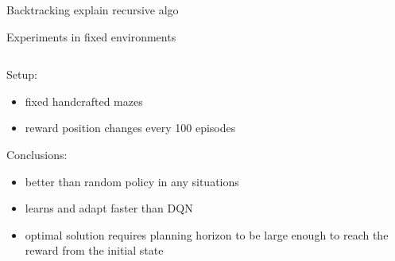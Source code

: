 \documentclass[default]{beamer}
\begin{document}
\begin{frame}{Backtracking}
	explain recursive algo
\end{frame}

\begin{frame}{Experiments in fixed environments}
\begin{columns}
	\begin{column}{.55\textwidth}
	Setup:
	\begin{itemize}
		\item fixed handcrafted mazes
		\item reward position changes every 100 episodes
	\end{itemize}

	\vspace*{12pt}
	Conclusions:
	\begin{itemize}
		\item better than random policy in any situations
		\item learns and adapt faster than DQN
		\item optimal solution requires planning horizon to be large enough to reach the reward from the initial state
	\end{itemize}

	\end{column}

	\begin{column}{.45\textwidth}
	\begin{center}
		
		
	\end{center}
	\end{column}
\end{columns}	
\end{frame}
\end{document}
